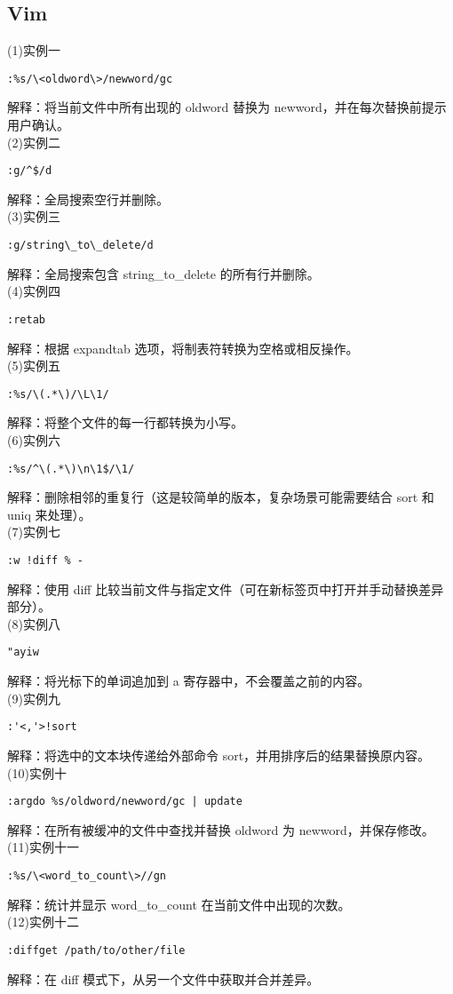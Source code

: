 \documentclass[a4paper, 12pt]{article}
\begin{document}
\subsection{Vim}
(1)实例一
\begin{Verbatim}
:%s/\<oldword\>/newword/gc
\end{Verbatim}
{\color{blue}
解释：将当前文件中所有出现的 oldword 替换为 newword，并在每次替换前提示用户确认。\\
}
(2)实例二
\begin{Verbatim}
:g/^$/d
\end{Verbatim}
{\color{blue}
解释：全局搜索空行并删除。\\
}
(3)实例三
\begin{Verbatim}
:g/string\_to\_delete/d
\end{Verbatim}
{\color{blue}
解释：全局搜索包含 string\_to\_delete 的所有行并删除。\\
}
(4)实例四
\begin{Verbatim}
:retab
\end{Verbatim}
{\color{blue}
解释：根据 expandtab 选项，将制表符转换为空格或相反操作。\\
}
(5)实例五
\begin{Verbatim}
:%s/\(.*\)/\L\1/
\end{Verbatim}
{\color{blue}
解释：将整个文件的每一行都转换为小写。\\
}
(6)实例六
\begin{Verbatim}
:%s/^\(.*\)\n\1$/\1/
\end{Verbatim}
{\color{blue}
解释：删除相邻的重复行（这是较简单的版本，复杂场景可能需要结合 sort 和 uniq 来处理）。\\
}
(7)实例七
\begin{Verbatim}
:w !diff % -
\end{Verbatim}
{\color{blue}
解释：使用 diff 比较当前文件与指定文件（可在新标签页中打开并手动替换差异部分）。\\
}
(8)实例八
\begin{Verbatim}
"ayiw
\end{Verbatim}
{\color{blue}
解释：将光标下的单词追加到 a 寄存器中，不会覆盖之前的内容。\\
}
(9)实例九
\begin{Verbatim}
:'<,'>!sort
\end{Verbatim}
{\color{blue}
解释：将选中的文本块传递给外部命令 sort，并用排序后的结果替换原内容。\\
}
(10)实例十
\begin{Verbatim}
:argdo %s/oldword/newword/gc | update
\end{Verbatim}
{\color{blue}
解释：在所有被缓冲的文件中查找并替换 oldword 为 newword，并保存修改。\\
}
(11)实例十一
\begin{Verbatim}
:%s/\<word_to_count\>//gn
\end{Verbatim}
{\color{blue}
解释：统计并显示 word\_to\_count 在当前文件中出现的次数。\\
}
(12)实例十二
\begin{Verbatim}
:diffget /path/to/other/file
\end{Verbatim}
{\color{blue}
解释：在 diff 模式下，从另一个文件中获取并合并差异。\\
}
\end{document}
